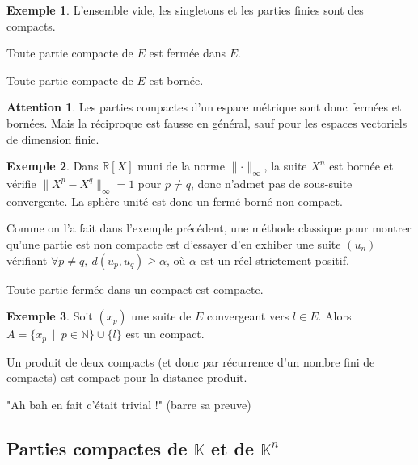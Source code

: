 \documentclass[french]{article}
\newcommand{\N}{\mathbb{N}}
\newcommand{\R}{\mathbb{R}}
\newcommand{\K}{\mathbb{K}}
\theoremstyle{plain}
\theoremstyle{definition}
\newtheorem*{ex}{Exemple}
\newtheorem*{attention}{Attention}
\theoremstyle{remark}
\begin{document}
\begin{ex}
	L'ensemble vide, les singletons et les parties finies sont des compacts.
\end{ex}

\begin{prop}
	Toute partie compacte de $E$ est fermée dans $E$.
\end{prop}

\begin{prop}
	Toute partie compacte de $E$ est bornée.
\end{prop}

\begin{attention}
	Les parties compactes d'un espace métrique sont donc fermées et bornées. Mais la réciproque est fausse en général, sauf pour les espaces vectoriels de dimension finie.
\end{attention}

\begin{ex}
	Dans $\R[X]$ muni de la norme $\lVert\cdot\rVert_\infty$, la suite $X^n$ est bornée et vérifie $\lVert X^p-X^q\rVert_\infty=1$ pour $p\ne q$, donc n'admet pas de sous-suite convergente. La sphère unité est donc un fermé borné non compact.
\end{ex}

\begin{met}
	Comme on l'a fait dans l'exemple précédent, une méthode classique pour montrer qu'une partie est non compacte est d'essayer d'en exhiber une suite $(u_n)$ vérifiant $\forall p\ne q,\ d(u_p,u_q)\geqslant\alpha$, où $\alpha$ est un réel strictement positif.
\end{met}

\begin{prop}%
	Toute partie fermée dans un compact est compacte.
\end{prop}

\begin{ex}%
	Soit $(x_p)$ une suite de $E$ convergeant vers $l\in E$. Alors $A=\{x_p\ \mid\ p\in\N\}\cup\{l\}$ est un compact.
\end{ex}

\begin{prop}%
	Un produit de deux compacts (et donc par récurrence d'un nombre fini de compacts) est compact pour la distance produit.
\end{prop}
"Ah bah en fait c'était trivial !" (barre sa preuve)

\subsection{Parties compactes de $\K$ et de $\K^n$}
\end{document}
